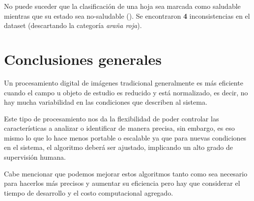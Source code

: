 No puede suceder que la clasificación de una hoja sea marcada como saludable mientras que su estado sea no-saludable (). Se encontraron \textbf{4} inconsistencias en el dataset (descartando la categoría \textit{araña roja}).

\section{Conclusiones generales}
Un procesamiento digital de imágenes tradicional generalmente es más eficiente cuando el campo u objeto de estudio es reducido y está normalizado, es decir, no hay mucha variabilidad en las condiciones que describen al sistema.

Este tipo de procesamiento nos da la flexibilidad de poder controlar las características a analizar o identificar de manera precisa, sin embargo, es eso mismo lo que lo hace menos portable o escalable ya que para nuevas condiciones en el sistema, el algoritmo deberá ser ajustado, implicando un alto grado de supervisión humana.

Cabe mencionar que podemos mejorar estos algoritmos tanto como sea necesario para hacerlos más precisos y aumentar su eficiencia pero hay que considerar el tiempo de desarrollo y el costo computacional agregado.